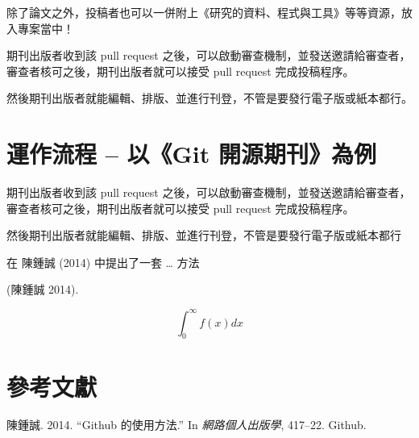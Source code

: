 \documentclass{article}
\begin{document}
除了論文之外，投稿者也可以一併附上《研究的資料、程式與工具》等等資源，放入專案當中！

期刊出版者收到該 pull request
之後，可以啟動審查機制，並發送邀請給審查者，審查者核可之後，期刊出版者就可以接受
pull request 完成投稿程序。

然後期刊出版者就能編輯、排版、並進行刊登，不管是要發行電子版或紙本都行。

\hypertarget{ux904bux4f5cux6d41ux7a0b-ux4ee5git-ux958bux6e90ux671fux520aux70baux4f8b}{%
\section{運作流程 -- 以《Git
開源期刊》為例}\label{ux904bux4f5cux6d41ux7a0b-ux4ee5git-ux958bux6e90ux671fux520aux70baux4f8b}}

期刊出版者收到該 pull request
之後，可以啟動審查機制，並發送邀請給審查者，審查者核可之後，期刊出版者就可以接受
pull request 完成投稿程序。

然後期刊出版者就能編輯、排版、並進行刊登，不管是要發行電子版或紙本都行

在 陳鍾誠 (2014) 中提出了一套 \ldots{} 方法

(陳鍾誠 2014).

\[
\int_0^{\infty} f(x) dx
\]

\hypertarget{ux53c3ux8003ux6587ux737b}{%
\section*{參考文獻}\label{ux53c3ux8003ux6587ux737b}}

\hypertarget{refs}{}
\leavevmode\hypertarget{ref-ccc2019}{}%
陳鍾誠. 2014. ``Github 的使用方法.'' In \emph{網路個人出版學}, 417--22.
Github.
\end{document}
